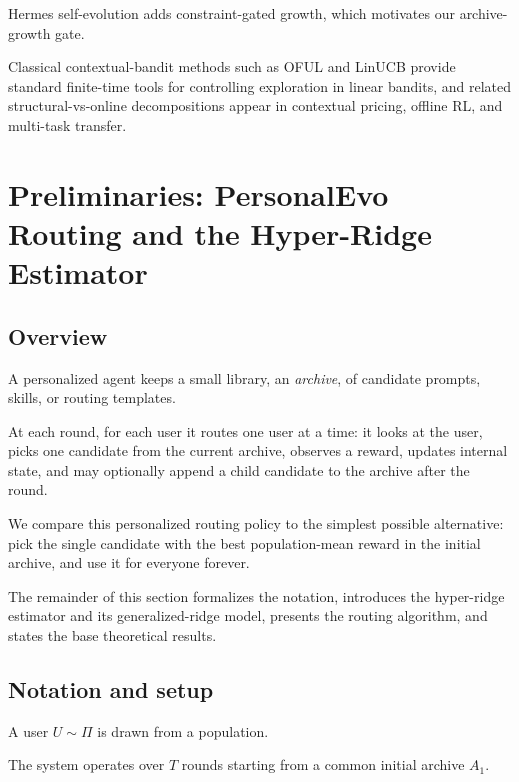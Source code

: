 \documentclass{article} %
\begin{document}
Hermes self-evolution \citep{hermes_selfevolution,hermes_agent} adds constraint-gated growth, which motivates our archive-growth gate.

Classical contextual-bandit methods such as OFUL and LinUCB \citep{abbasi2011oful,chu2011linucb,li2010contextual} provide standard finite-time tools for controlling exploration in linear bandits, and related structural-vs-online decompositions appear in contextual pricing, offline RL, and multi-task transfer.

\section{Preliminaries: PersonalEvo Routing and the Hyper-Ridge Estimator}
\label{sec:background}

\label{sec:method}

\subsection{Overview}

\label{sec:method-plain}

A personalized agent keeps a small library, an \emph{archive}, of candidate prompts, skills, or routing templates.

At each round, for each user it routes one user at a time: it looks at the user, picks one candidate from the current archive, observes a reward, updates internal state, and may optionally append a child candidate to the archive after the round.

We compare this personalized routing policy to the simplest possible alternative: pick the single candidate with the best population-mean reward in the initial archive, and use it for everyone forever.

The remainder of this section formalizes the notation, introduces the hyper-ridge estimator and its generalized-ridge model, presents the routing algorithm, and states the base theoretical results.

\subsection{Notation and setup}

\label{sec:method-notation}

A user $U \sim \Pi$ is drawn from a population.

The system operates over $T$ rounds starting from a common initial archive $A_1$.
\end{document}

